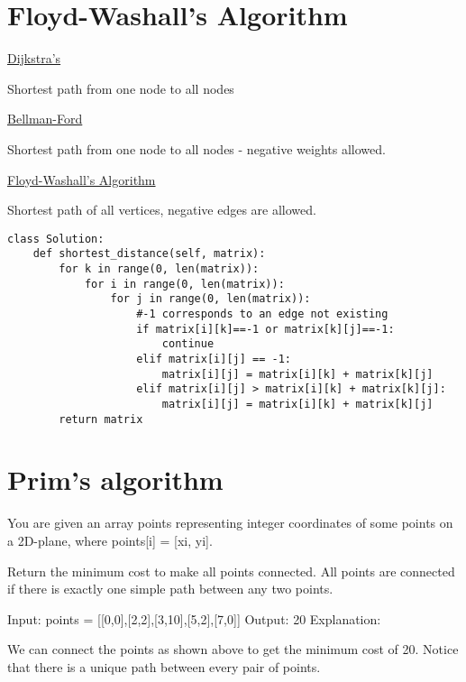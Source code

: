 \documentclass[24pt, a4]{article}
\begin{document}
\section{Floyd-Washall's Algorithm}
\underline {Dijkstra's}

Shortest path from one node to all nodes

\underline {Bellman-Ford}

Shortest path from one node to all nodes - negative weights allowed.

\underline {Floyd-Washall's Algorithm}

Shortest path of all vertices, negative edges are allowed.

\begin{lstlisting}
class Solution:
	def shortest_distance(self, matrix):
		for k in range(0, len(matrix)):
		    for i in range(0, len(matrix)):
		        for j in range(0, len(matrix)):
		            #-1 corresponds to an edge not existing
		            if matrix[i][k]==-1 or matrix[k][j]==-1:
		                continue
		            elif matrix[i][j] == -1:
		                matrix[i][j] = matrix[i][k] + matrix[k][j]
		            elif matrix[i][j] > matrix[i][k] + matrix[k][j]:
		                matrix[i][j] = matrix[i][k] + matrix[k][j]
		return matrix
\end{lstlisting}
\newpage
\section{Prim's algorithm}

You are given an array points representing integer coordinates of some points 
on a 2D-plane, where points[i] = [xi, yi].

Return the minimum cost to make all points connected. All points are connected
if there is exactly one simple path between any two points.

Input: points = [[0,0],[2,2],[3,10],[5,2],[7,0]]
Output: 20
Explanation:

We can connect the points as shown above to get the minimum cost of 20.
Notice that there is a unique path between every pair of points.
\end{document}
